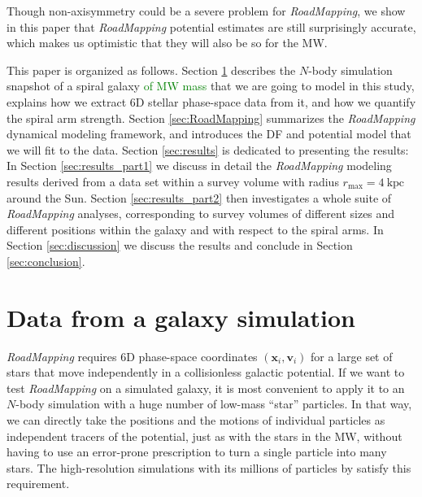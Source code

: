 \documentclass[iop,revtex4,numberedappendix,appendixfloats]{emulateapj}
\newcommand{\vect}[1]{\boldsymbol{#1}}
\newcommand{\RM}{{\sl RoadMapping}}
\newcommand{\NEW}[1]{\textcolor{Green}{#1}}
\newcommand{\OLD}[1]{}
\begin{document}
Though non-axisymmetry could be a severe problem for \RM{}, we show in this paper that \RM{} potential estimates are still surprisingly accurate, which makes us optimistic that they will also be so for the MW. 

This paper is organized as follows. Section \ref{sec:simulation} describes the $N$-body simulation snapshot of a \OLD{MW-like} spiral galaxy \NEW{of MW mass} that we are going to model in this study, explains how we extract 6D stellar phase-space data from it, and how we quantify the spiral arm strength. Section \ref{sec:RoadMapping} summarizes the \RM{} dynamical modeling framework, and introduces the DF and potential model that we will fit to the data. Section \ref{sec:results} is dedicated to presenting the results: In Section \ref{sec:results_part1} we discuss in detail the \RM{} modeling results derived from a data set within a survey volume with radius $r_\text{max}=4~\text{kpc}$ around the Sun. Section \ref{sec:results_part2} then investigates a whole suite of \RM{} analyses, corresponding to survey volumes of different sizes and different positions within the galaxy and with respect to the spiral arms. In Section \ref{sec:discussion} we discuss the results and conclude in Section \ref{sec:conclusion}.

\section{Data from a galaxy simulation} \label{sec:simulation}

\RM{} requires 6D phase-space coordinates $(\vect{x}_i,\vect{v}_i)$ for a large set of stars that move independently in a collisionless galactic potential. If we want to test \RM{} on a simulated galaxy, it is most convenient to apply it to an $N$-body simulation with a huge number of low-mass ``star'' particles. In that way, we can directly take the positions and the motions of individual particles as independent tracers of the potential, just as with the stars in the MW, without having to use an error-prone prescription to turn a single particle into many stars. The high-resolution simulations with its millions of particles by \citet{2013ApJ...766...34D} satisfy this requirement.
\end{document}
